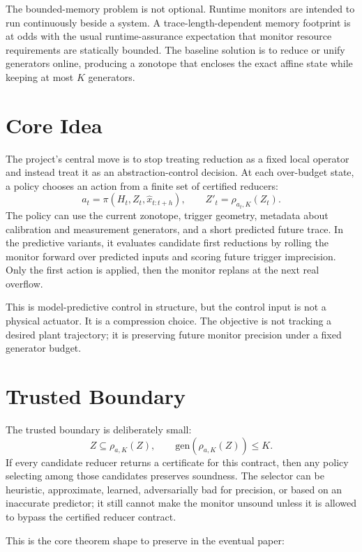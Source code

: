\documentclass[11pt]{article}
\begin{document}
The bounded-memory problem is not optional. Runtime monitors are intended to
run continuously beside a system. A trace-length-dependent memory footprint is
at odds with the usual runtime-assurance expectation that monitor resource
requirements are statically bounded. The baseline solution is to reduce or
unify generators online, producing a zonotope that encloses the exact affine
state while keeping at most \(K\) generators.

\section{Core Idea}

The project's central move is to stop treating reduction as a fixed local
operator and instead treat it as an abstraction-control decision. At each
over-budget state, a policy chooses an action from a finite set of certified
reducers:
\[
  a_t = \pi(H_t, Z_t, \widehat{x}_{t:t+h}),
  \qquad
  Z'_t = \rho_{a_t,K}(Z_t).
\]
The policy can use the current zonotope, trigger geometry, metadata about
calibration and measurement generators, and a short predicted future trace. In
the predictive variants, it evaluates candidate first reductions by rolling the
monitor forward over predicted inputs and scoring future trigger imprecision.
Only the first action is applied, then the monitor replans at the next real
overflow.

This is model-predictive control in structure, but the control input is not a
physical actuator. It is a compression choice. The objective is not tracking a
desired plant trajectory; it is preserving future monitor precision under a
fixed generator budget.

\section{Trusted Boundary}

The trusted boundary is deliberately small:
\[
  Z \subseteq \rho_{a,K}(Z),
  \qquad
  \mathrm{gen}(\rho_{a,K}(Z)) \le K.
\]
If every candidate reducer returns a certificate for this contract, then any
policy selecting among those candidates preserves soundness. The selector can
be heuristic, approximate, learned, adversarially bad for precision, or based
on an inaccurate predictor; it still cannot make the monitor unsound unless it
is allowed to bypass the certified reducer contract.

This is the core theorem shape to preserve in the eventual paper:
\end{document}
